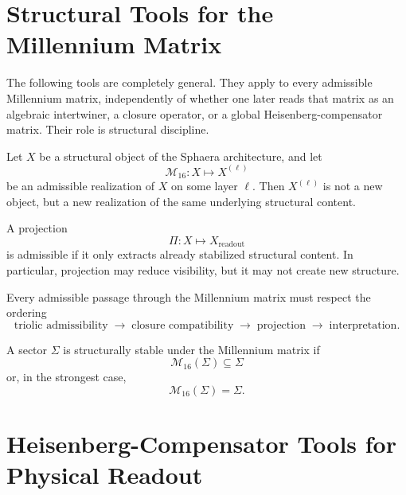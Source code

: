 \section{Structural Tools for the Millennium Matrix}
\label{app:mm-tools}

\begin{remark}
The following tools are completely general. They apply to every admissible
Millennium matrix, independently of whether one later reads that matrix as an
algebraic intertwiner, a closure operator, or a global Heisenberg-compensator
matrix. Their role is structural discipline.
\end{remark}

\begin{definition}
Let $X$ be a structural object of the Sphaera architecture, and let
\[
\mathcal M_{16}: X \mapsto X^{(\ell)}
\]
be an admissible realization of $X$ on some layer $\ell$. Then $X^{(\ell)}$
is not a new object, but a new realization of the same underlying structural
content.
\end{definition}

\begin{definition}
A projection
\[
\Pi: X \mapsto X_{\mathrm{readout}}
\]
is admissible if it only extracts already stabilized structural content. In
particular, projection may reduce visibility, but it may not create new
structure.
\end{definition}

\begin{definition}
Every admissible passage through the Millennium matrix must respect the
ordering
\[
\text{triolic admissibility}
\;\longrightarrow\;
\text{closure compatibility}
\;\longrightarrow\;
\text{projection}
\;\longrightarrow\;
\text{interpretation}.
\]
\end{definition}

\begin{definition}
A sector $\Sigma$ is structurally stable under the Millennium matrix if
\[
\mathcal M_{16}(\Sigma)\subseteq\Sigma
\]
or, in the strongest case,
\[
\mathcal M_{16}(\Sigma)=\Sigma.
\]
\end{definition}

\section{Heisenberg-Compensator Tools for Physical Readout}
\label{app:hc-tools}

